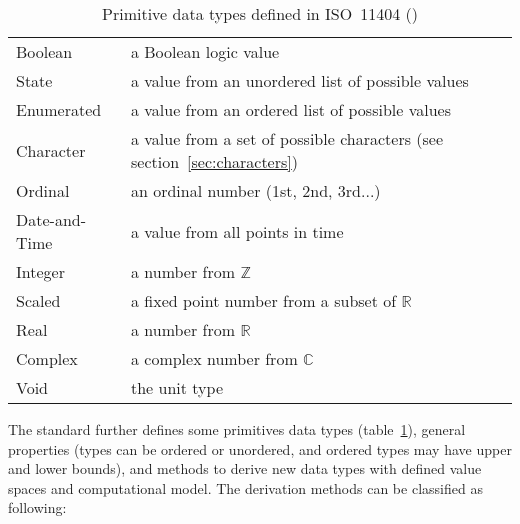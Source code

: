 \begin{table}
\centering
\begin{tabular}{|l|l|}
\hline
 Boolean    & a Boolean logic value \\
 State      & a value from an unordered list of possible values \\
 Enumerated & a value from an ordered list of possible values \\
 Character  & a value from a set of possible characters (see section~\ref{sec:characters}) \\
 Ordinal    & an ordinal number (1st, 2nd, 3rd...) \\
 Date-and-Time & a value from all points in time \\
 Integer    & a number from $\mathbb{Z}$ \\
 Scaled     & a fixed point number from a subset of $\mathbb{R}$ \\
 Real       & a number from $\mathbb{R}$ \\
 Complex    & a complex number from $\mathbb{C}$ \\
 Void       & the unit type \\
\hline
\end{tabular}
\caption{Primitive data types defined in ISO~11404 (\citeyear{ISO11404})}
\label{iso11404primitives}
\end{table}

The standard further defines some primitives data types 
(table~\ref{iso11404primitives}), general properties (types can be 
ordered or unordered, and ordered types may have upper and lower bounds),
and methods to derive new data types with defined value spaces and
computational model. The derivation methods can be classified as following:

